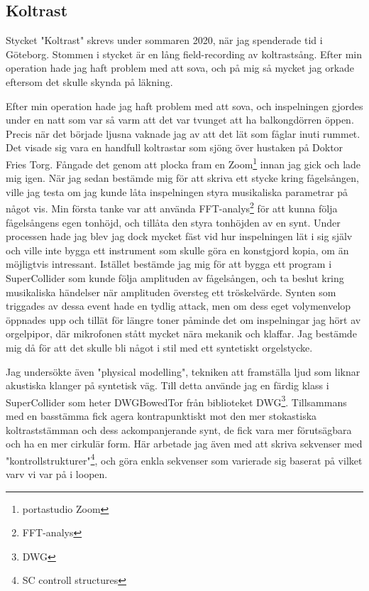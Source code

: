 \documentclass{article}
\begin{document}
	\subsection{Koltrast}
	Stycket "Koltrast" skrevs under sommaren 2020, när jag spenderade tid i Göteborg. Stommen i stycket är en
	lång field-recording av koltrastsång. Efter min operation hade jag haft problem med att sova, och
	på mig så mycket jag orkade eftersom det skulle skynda på läkning. 

	Efter min operation hade jag haft problem med att sova, och
	inspelningen gjordes under en natt som var så varm att det var tvunget att ha balkongdörren öppen. Precis
	när det började ljusna vaknade jag av att det lät som fåglar inuti rummet. Det visade sig vara en handfull
	koltrastar som sjöng över hustaken på Doktor Fries Torg. Fångade det genom att plocka fram en
	Zoom\footnote{portastudio Zoom} innan jag gick och lade mig igen. 
		När jag sedan bestämde mig för att skriva ett stycke kring fågelsången, ville jag testa om jag kunde
	låta inspelningen styra musikaliska parametrar på något vis. Min första tanke var att använda
	FFT-analys\footnote{FFT-analys} för att kunna följa fågelsångens egen tonhöjd, och tillåta den styra
	tonhöjden av en synt. Under processen hade jag blev jag dock mycket fäst vid hur inspelningen lät i sig
	själv och ville inte bygga ett instrument som skulle göra en konstgjord kopia, om än möjligtvis
	intressant. Istället bestämde jag mig för att bygga ett program i SuperCollider som kunde följa amplituden
	av fågelsången, och ta beslut kring musikaliska händelser när amplituden översteg ett tröskelvärde. Synten
	som triggades av dessa event hade en tydlig attack, men om dess eget volymenvelop öppnades upp och tillät
	för längre toner påminde det om inspelningar jag hört av orgelpipor, där mikrofonen stått mycket nära
	mekanik och klaffar. Jag bestämde mig då för att det skulle bli något i stil med ett syntetiskt
	orgelstycke. 


	Jag undersökte även "physical modelling", tekniken att framställa ljud som liknar akustiska klanger på
	syntetisk väg. Till detta använde jag en färdig klass i SuperCollider som heter DWGBowedTor från
	biblioteket DWG\footnote{DWG}. Tillsammans med en basstämma fick agera kontrapunktiskt mot den mer
	stokastiska koltraststämman och dess ackompanjerande synt, de fick vara mer förutsägbara och ha en mer
	cirkulär form. Här arbetade jag även med att skriva sekvenser med "kontrollstrukturer"\footnote{SC
	controll structures}, och göra enkla sekvenser som varierade sig baserat på vilket varv vi var på i
	loopen. 
	\pagebreak
\end{document}
